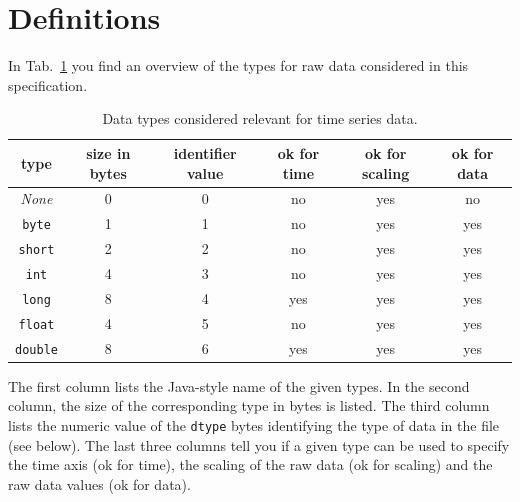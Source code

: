 \documentclass[a4paper,10pt]{article}
\begin{document}
\section{Definitions}\label{sec:definitions}
In Tab.~\ref{tab:data types} you find an overview of the types for raw data considered in this specification.
\begin{table}[htbp]
 \centering
 \begin{tabular}{|c|c|c|c|c|c|}
    \hline
    type            & size in bytes & identifier value & ok for time & ok for scaling & ok for data \\
    \hline
    \textit{None}   & 0             & 0                & no          & yes            & no          \\
    \hline                                                                            
    \texttt{byte}   & 1             & 1                & no          & yes            & yes         \\
    \hline                                                                            
    \texttt{short}  & 2             & 2                & no          & yes            & yes         \\
    \hline                                                                            
    \texttt{int}    & 4             & 3                & no          & yes            & yes         \\
    \hline                                                                            
    \texttt{long}   & 8             & 4                & yes         & yes            & yes         \\
    \hline                                                                            
    \texttt{float}  & 4             & 5                & no          & yes            & yes         \\
    \hline                                                                            
    \texttt{double} & 8             & 6                & yes         & yes            & yes         \\
    \hline
 \end{tabular}
 \caption{Data types considered relevant for time series data.}
 \label{tab:data types}
\end{table}

The first column lists the Java-style name of the given types.
In the second column, the size of the corresponding type in bytes is listed.
The third column lists the numeric value of the \texttt{dtype} bytes identifying the type of data in the file (see below).
The last three columns tell you if a given type can be used to specify the time axis (ok for time),
the scaling of the raw data (ok for scaling) and the raw data values (ok for data).
\end{document}
